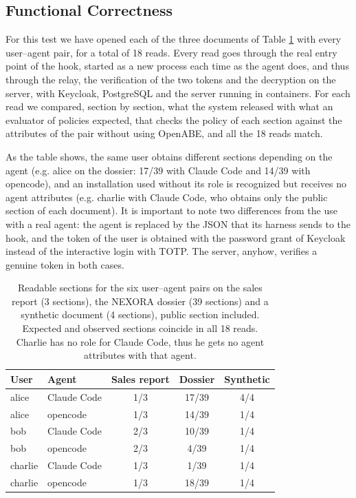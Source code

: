 \subsection{Functional Correctness}
For this test we have opened each of the three documents of Table \ref{tab:eval-matrix} with every user--agent pair, for a total of 18 reads.
Every read goes through the real entry point of the hook, started as a new process each time as the agent does, and thus through the relay, the verification of the two tokens and the decryption on the server, with Keycloak, PostgreSQL and the server running in containers.
For each read we compared, section by section, what the system released with what an evaluator of policies expected, that checks the policy of each section against the attributes of the pair without using OpenABE, and all the 18 reads match.

As the table shows, the same user obtains different sections depending on the agent (e.g. alice on the dossier: 17/39 with Claude Code and 14/39 with opencode), and an installation used without its role is recognized but receives no agent attributes (e.g. charlie with Claude Code, who obtains only the public section of each document).
It is important to note two differences from the use with a real agent: the agent is replaced by the JSON that its harness sends to the hook, and the token of the user is obtained with the password grant of Keycloak instead of the interactive login with TOTP. The server, anyhow, verifies a genuine token in both cases.

\begin{table}[H]
  \centering
  \begingroup\linespread{1.0}\small
  \begin{tabular}{@{}llccc@{}}
    \toprule
    \textbf{User} & \textbf{Agent} & \textbf{Sales report} & \textbf{Dossier} & \textbf{Synthetic} \\
    \midrule
    alice   & Claude Code & 1/3 & 17/39 & 4/4 \\
    alice   & opencode    & 1/3 & 14/39 & 1/4 \\
    bob     & Claude Code & 2/3 & 10/39 & 1/4 \\
    bob     & opencode    & 2/3 & 4/39  & 1/4 \\
    charlie & Claude Code & 1/3 & 1/39  & 1/4 \\
    charlie & opencode    & 1/3 & 18/39 & 1/4 \\
    \bottomrule
  \end{tabular}
  \endgroup
  \caption{Readable sections for the six user--agent pairs on the sales report (3 sections), the NEXORA dossier (39 sections) and a synthetic document (4 sections), public section included. Expected and observed sections coincide in all 18 reads. Charlie has no role for Claude Code, thus he gets no agent attributes with that agent.}\label{tab:eval-matrix}
\end{table}

